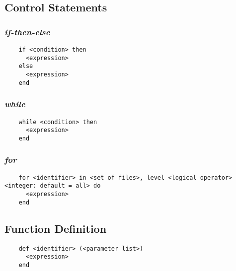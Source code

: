 \documentclass[11pt]{article}
\begin{document}
\newpage

\subsection{Control Statements}
\subsubsection{\emph{if-then-else}}
\begin{listing}[H]
  \begin{verbatim}
    if <condition> then
      <expression>
    else
      <expression>
    end
  \end{verbatim}
  \label{lst:the-code}
\end{listing}

\subsubsection{\emph{while}}
\begin{listing}[H]
  \begin{verbatim}
    while <condition> then
      <expression>
    end
  \end{verbatim}
  \label{lst:the-code}
\end{listing}

\subsubsection{\emph{for}}
\begin{listing}[H]
  \begin{verbatim}
    for <identifier> in <set of files>, level <logical operator> <integer: default = all> do
      <expression>
    end
  \end{verbatim}
  \label{lst:the-code}
\end{listing}
\subsection{Function Definition}
\begin{listing}[H]
  \begin{verbatim}
    def <identifier> (<parameter list>)
      <expression>
    end
  \end{verbatim}
  \label{lst:the-code}
\end{listing}
\end{document}
